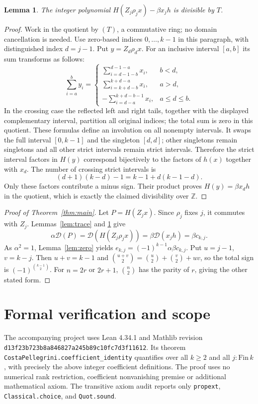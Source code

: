 \documentclass[11pt]{article}
\newtheorem{lemma}{Lemma}
\newcommand{\D}{\mathcal D}
\begin{document}
\begin{lemma}\label{lem:boundary}
The integer polynomial $H(Z_j\rho_jx)-\beta x_jh$ is divisible by $T$.
\end{lemma}
\begin{proof}
Work in the quotient by $(T)$, a commutative ring; no domain cancellation
is needed. Use zero-based indices $0,\ldots,k-1$ in this paragraph,
with distinguished index $d=j-1$. Put $y=Z_d\rho_dx$.
For an inclusive interval $[a,b]$ its sum transforms as follows:
\[
 \sum_{i=a}^b y_i=
 \begin{cases}
  \sum_{i=d-1-b}^{d-1-a}x_i,& b<d,\\
  \sum_{i=k+d-b}^{k+d-a}x_i,& a>d,\\
  -\sum_{i=d-a}^{k+d-b-1}x_i,&a\le d\le b.
 \end{cases}
\]
In the crossing case the reflected left and right tails, together with
the displayed complementary interval, partition all original indices;
the total sum is zero in this quotient.
These formulas define an involution on all nonempty intervals. It swaps
the full interval $[0,k-1]$ and the singleton $[d,d]$; other singletons
remain singletons and all other strict intervals remain strict intervals.
Therefore the strict interval factors in $H(y)$ correspond bijectively
to the factors of $h(x)$ together with $x_d$.
The number of crossing strict intervals is
\[
 (d+1)(k-d)-1=k-1+d(k-1-d).
\]
Only these factors contribute a minus sign. Their product proves
$H(y)=\beta x_dh$ in the quotient, which is exactly the claimed
divisibility over $\mathbb Z$.
\end{proof}

\begin{proof}[Proof of Theorem~\ref{thm:main}]
Let $P=H(Z_jx)$. Since $\rho_j$ fixes $j$, it commutes with $Z_j$.
Lemmas~\ref{lem:trace} and \ref{lem:boundary} give
\[
 \alpha\D(P)=\D(H(Z_j\rho_jx))=\beta\D(x_jh)=\beta c_{k,j}.
\]
As $\alpha^2=1$, Lemma~\ref{lem:zero} yields
$e_{k,j}=(-1)^{k-1}\alpha\beta c_{k,j}$.
Put $u=j-1$, $v=k-j$. Then $u+v=k-1$ and
$\binom{u+v}{2}=\binom u2+\binom v2+uv$,
so the total sign is $(-1)^{\binom{k-1}{2}}$.
For $n=2r$ or $2r+1$, $\binom n2$ has the parity of $r$,
giving the other stated form.
\end{proof}

\section{Formal verification and scope}
The accompanying project uses Lean 4.34.1 and Mathlib revision
\texttt{d13f23b723b8a846827a245b89c10fc7d3f11612}.
Its theorem \texttt{CostaPellegrini.coefficient\_identity} quantifies over
all $k\ge2$ and all $j:\mathrm{Fin}\,k$, with precisely the above integer
coefficient definitions. The proof uses no numerical rank restriction,
coefficient nonvanishing premise or additional mathematical axiom.
The transitive axiom audit reports only
\texttt{propext}, \texttt{Classical.choice}, and \texttt{Quot.sound}.
\end{document}

